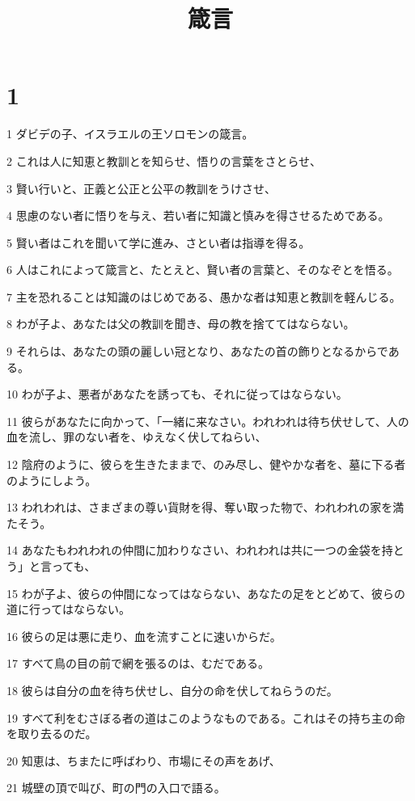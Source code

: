 

\title{箴言}


\chapter{1}

\par 1 ダビデの子、イスラエルの王ソロモンの箴言。
\par 2 これは人に知恵と教訓とを知らせ、悟りの言葉をさとらせ、
\par 3 賢い行いと、正義と公正と公平の教訓をうけさせ、
\par 4 思慮のない者に悟りを与え、若い者に知識と慎みを得させるためである。
\par 5 賢い者はこれを聞いて学に進み、さとい者は指導を得る。
\par 6 人はこれによって箴言と、たとえと、賢い者の言葉と、そのなぞとを悟る。
\par 7 主を恐れることは知識のはじめである、愚かな者は知恵と教訓を軽んじる。
\par 8 わが子よ、あなたは父の教訓を聞き、母の教を捨ててはならない。
\par 9 それらは、あなたの頭の麗しい冠となり、あなたの首の飾りとなるからである。
\par 10 わが子よ、悪者があなたを誘っても、それに従ってはならない。
\par 11 彼らがあなたに向かって、「一緒に来なさい。われわれは待ち伏せして、人の血を流し、罪のない者を、ゆえなく伏してねらい、
\par 12 陰府のように、彼らを生きたままで、のみ尽し、健やかな者を、墓に下る者のようにしよう。
\par 13 われわれは、さまざまの尊い貨財を得、奪い取った物で、われわれの家を満たそう。
\par 14 あなたもわれわれの仲間に加わりなさい、われわれは共に一つの金袋を持とう」と言っても、
\par 15 わが子よ、彼らの仲間になってはならない、あなたの足をとどめて、彼らの道に行ってはならない。
\par 16 彼らの足は悪に走り、血を流すことに速いからだ。
\par 17 すべて鳥の目の前で網を張るのは、むだである。
\par 18 彼らは自分の血を待ち伏せし、自分の命を伏してねらうのだ。
\par 19 すべて利をむさぼる者の道はこのようなものである。これはその持ち主の命を取り去るのだ。
\par 20 知恵は、ちまたに呼ばわり、市場にその声をあげ、
\par 21 城壁の頂で叫び、町の門の入口で語る。
